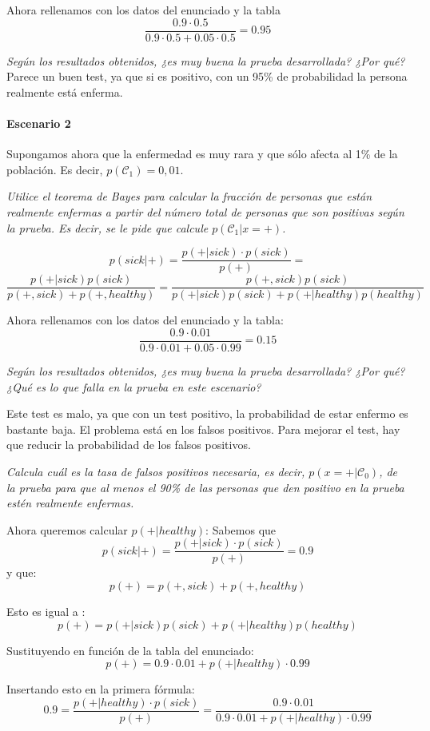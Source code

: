Ahora rellenamos con los datos del enunciado y la tabla
$$\frac{0.9 \cdot 0.5}{0.9 \cdot 0.5 + 0.05 \cdot 0.5} = 0.95$$

\textit{Según los resultados obtenidos, ¿es muy buena la prueba desarrollada? ¿Por qué?}
Parece un buen test, ya que si es positivo, con un 95\% de probabilidad la persona realmente está enferma.

\paragraph{Escenario 2}
Supongamos ahora que la enfermedad es muy rara y que sólo afecta al 1\% de la población. Es decir, $p(\mathcal{C}_1)=0,01$. 

\textit{Utilice el teorema de Bayes para calcular la fracción de personas que están realmente enfermas a partir del número total de personas que son positivas según la prueba. Es decir, se le pide que calcule $p(\mathcal{C}_1|x=\text{+})$.}

$$p(sick|+) = \frac{p(+|sick) \cdot p(sick)}{p(+)} = $$
$$\frac{p(+|sick) p(sick)}{p(+, sick) + p(+, healthy)} = \frac{p(+, sick) p(sick)}{p(+|sick)p(sick) + p(+|healthy) p(healthy)}$$

Ahora rellenamos con los datos del enunciado y la tabla:
$$\frac{0.9 \cdot 0.01}{0.9 \cdot 0.01 + 0.05 \cdot 0.99} = 0.15$$

\textit{Según los resultados obtenidos, ¿es muy buena la prueba desarrollada? ¿Por qué? ¿Qué es lo que falla en la prueba en este escenario?}

Este test es malo, ya que con un test positivo, la probabilidad de estar enfermo es bastante baja. El problema está en los falsos positivos. Para mejorar el test, hay que reducir la probabilidad de los falsos positivos.

\textit{Calcula cuál es la tasa de falsos positivos necesaria, es decir, $p(x=\text{+}|\mathcal{C}_0)$, de la prueba para que al menos el 90\% de las personas que den positivo en la prueba estén realmente enfermas.}

Ahora queremos calcular $p(+ | healthy)$:
Sabemos que 
$$p(sick|+) = \frac{p(+|sick) \cdot p(sick)}{p(+)} = 0.9$$
y que:
$$p(+) = p(+, sick) + p(+, healthy)$$

Esto es igual a :
$$p(+) = p(+|sick) p(sick) + p(+|healthy) p(healthy)$$

Sustituyendo en función de la tabla del enunciado:
$$p(+) = 0.9 \cdot 0.01 + p(+|healthy) \cdot 0.99$$

Insertando esto en la primera fórmula:
$$0.9 = \frac{ p(+|healthy) \cdot p(sick)}{p(+)} = \frac{0.9 \cdot 0.01}{0.9 \cdot 0.01 +  p(+|healthy) \cdot 0.99}$$

